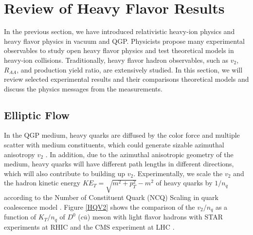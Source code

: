 \chapter{Review of Heavy Flavor Results}

In the previous section, we have introduced relativistic heavy-ion physics and heavy flavor physics in vacuum and QGP. Physicists propose many experimental observables to study open heavy flavor physics and test theoretical models in heavy-ion collisions. Traditionally, heavy flavor hadron observables, such as $v_2$, $R_{AA}$, and production yield ratio, are extensively studied. In this section, we will review selected experimental results and their comparisons theoretical models and discuss the physics messages from the measurements.


\section{Elliptic Flow}


In the QGP medium, heavy quarks are diffused by the color force and multiple scatter with medium constituents, which could generate sizable azimuthal anisotropy $v_2$ \cite{HQReview}. In addition, due to the azimuthal anisotropic geometry of the medium, heavy quarks will have different path lengths in different directions, which will also contribute to building up $v_2$. Experimentally, we scale the $v_2$ and the hadron kinetic energy $KE_T = \sqrt{m^2 + p_T^2} - m^2$ of heavy quarks by $1/n_q$ according to the Number of Constituent Quark (NCQ) Scaling in quark coalescence model \cite{NCQScaling}. Figure \ref{HQV2} shows the comparison of the $v_2/n_q$ as a function of $K_T/n_q$ of $D^0$ ($c\bar u$) meson with light flavor hadrons with STAR experiments at RHIC \cite{STARD0v2} and the CMS experiment at LHC \cite{CMSD0v2}.


